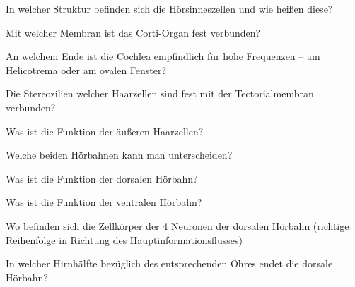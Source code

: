 \documentclass[10pt, a4paper]{exam}
\begin{document}
\begin{questions}
  \question In welcher Struktur befinden sich die Hörsinneszellen und wie heißen diese?
  \begin{solution}

  \end{solution}

  \question Mit welcher Membran ist das Corti-Organ fest verbunden?
  \begin{solution}

  \end{solution}

  \question An welchem Ende ist die Cochlea empfindlich für hohe Frequenzen – am Helicotrema oder am ovalen Fenster?
  \begin{solution}

  \end{solution}

  \question Die Stereozilien welcher Haarzellen sind fest mit der Tectorialmembran verbunden?
  \begin{solution}

  \end{solution}

  \question Was ist die Funktion der äußeren Haarzellen?
  \begin{solution}

  \end{solution}

  \question Welche beiden Hörbahnen kann man unterscheiden?
  \begin{solution}

  \end{solution}

  \question Was ist die Funktion der dorsalen Hörbahn?
  \begin{solution}

  \end{solution}

  \question Was ist die Funktion der ventralen Hörbahn?
  \begin{solution}

  \end{solution}

  \question Wo befinden sich die Zellkörper der 4 Neuronen der dorsalen Hörbahn (richtige Reihenfolge in Richtung des Hauptinformationsflusses)
  \begin{solution}

  \end{solution}

  \question In welcher Hirnhälfte bezüglich des entsprechenden Ohres endet die dorsale Hörbahn?
  \begin{solution}


\end{solution}
\end{questions}
\end{document}
